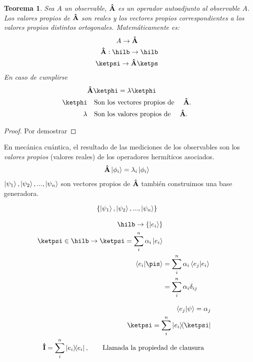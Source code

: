 \newtheorem{theorem}{Teorema}
\begin{theorem}
    Sea $A$ un observable, $\vu{A}$ es un operador autoadjunto  al observable $A$. Los valores propios de $\vu{A}$ son reales y los vectores propios correspondientes a los valores propios distintos ortogonales. Matemáticamente es:
    $$
        A\rightarrow\vu{A}
    $$
    \begin{align*}
        \vu{A}:\hilb\then\hilb\\
        \ketpsi\then\vu{A}\ketps
    \end{align*}
    En caso de cumplirse
    \begin{align*}
        &\vu{A}\ketphi=\lambda\ketphi\\
        \ketphi&\qq{Son los vectores propios de }\vu{A}.\\
        \lambda&\qq{Son los valores propios de }\vu{A}.\\
    \end{align*}

\end{theorem}

\begin{proof}
    Por demostrar
\end{proof}

En mecánica cuántica, el resultado de las mediciones de los observables son los \textit{valores propios} (valores reales) de los operadores hermíticos asociados.
\begin{align*}
    \vu{A}\ket{\phi_i}=\lambda_i\ket{\phi_i}
\end{align*}
$\ket{\psi_1},\ket{\psi_2},...,\ket{\psi_n}$ son vectores propios de $\vu{A}$ también construimos una base generadora.

\begin{align*}
    \{\ket{\psi_1},\ket{\psi_2},...,\ket{\psi_n}\}
\end{align*}


\begin{align*}
    \hilb\then\{\ket{e_i}\}\\
    \ketpsi\in\hilb\then\ketpsi=\sum_i^n\alpha_i\ket{e_i}\\
    \braket{e_i}{\pis}&=\sum_i^n\alpha_i\braket{e_j}{e_i}\\
    &=\sum_i^n\alpha_i\delta_{ij}
\end{align*}

\begin{align*}
    \braket{e_j}{\psi}=\alpha_j\\
    \ketpsi=\sum_i^n\op{e_i}\ketpsi\\
    \vu{I}=\sum_i^n\op{e_i}\qc\qq{Llamada la propiedad de clausura}
\end{align*}

